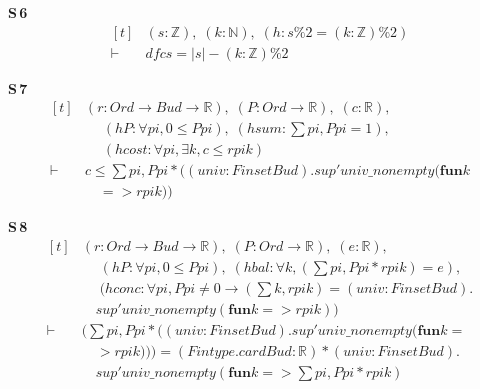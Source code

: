 \noindent\textbf{S\,6}\quad{}
{\footnotesize\[ \begin{aligned}[t]
&(\mathit{s} : \mathbb{Z} ),\; (\mathit{k} : \mathbb{N} ),\; (\mathit{h} : \mathit{s} \% 2 = (\mathit{k} : \mathbb{Z} ) \% 2)\\
\vdash\;&\mathit{dfc} \mathit{s} = |\mathit{s}| - (\mathit{k} : \mathbb{Z} ) \% 2
\end{aligned} \]}

\noindent\textbf{S\,7}\quad{}
{\footnotesize\[ \begin{aligned}[t]
&(\mathit{r} : \mathit{Ord} \to \mathit{Bud} \to \mathbb{R} ),\; (\mathit{P} : \mathit{Ord} \to \mathbb{R} ),\; (\mathit{c} : \mathbb{R} ),\\
&\quad \; (\mathit{hP} : \forall \mathit{pi}, 0 \leq \mathit{P} \mathit{pi}),\; (\mathit{hsum} : \textstyle\sum \mathit{pi}, \mathit{P} \mathit{pi} = 1),\\
&\quad \; (\mathit{hcost} : \forall \mathit{pi}, \exists \mathit{k}, \mathit{c} \leq \mathit{r} \mathit{pi} \mathit{k})\\
\vdash\;&\mathit{c} \leq \textstyle\sum \mathit{pi}, \mathit{P} \mathit{pi} * ((\mathit{univ} : \mathit{Finset} \mathit{Bud}).\mathit{sup'} \mathit{univ\_nonempty} (\mathbf{fun} \mathit{k}\\
&\quad => \mathit{r} \mathit{pi} \mathit{k}))
\end{aligned} \]}

\noindent\textbf{S\,8}\quad{}
{\footnotesize\[ \begin{aligned}[t]
&(\mathit{r} : \mathit{Ord} \to \mathit{Bud} \to \mathbb{R} ),\; (\mathit{P} : \mathit{Ord} \to \mathbb{R} ),\; (\mathit{e} : \mathbb{R} ),\\
&\quad \; (\mathit{hP} : \forall \mathit{pi}, 0 \leq \mathit{P} \mathit{pi}),\; (\mathit{hbal} : \forall \mathit{k}, (\textstyle\sum \mathit{pi}, \mathit{P} \mathit{pi} * \mathit{r} \mathit{pi} \mathit{k}) = \mathit{e}),\\
&\quad \; (\mathit{hconc} : \forall \mathit{pi}, \mathit{P} \mathit{pi} \neq 0 \to (\textstyle\sum \mathit{k}, \mathit{r} \mathit{pi} \mathit{k}) = (\mathit{univ} : \mathit{Finset} \mathit{Bud}).\\
&\quad \mathit{sup'} \mathit{univ\_nonempty} (\mathbf{fun} \mathit{k} => \mathit{r} \mathit{pi} \mathit{k}))\\
\vdash\;&(\textstyle\sum \mathit{pi}, \mathit{P} \mathit{pi} * ((\mathit{univ} : \mathit{Finset} \mathit{Bud}).\mathit{sup'} \mathit{univ\_nonempty} (\mathbf{fun} \mathit{k} =\\
&\quad > \mathit{r} \mathit{pi} \mathit{k}))) = (\mathit{Fintype}.\mathit{card} \mathit{Bud} : \mathbb{R} ) * (\mathit{univ} : \mathit{Finset} \mathit{Bud}).\\
&\quad \mathit{sup'} \mathit{univ\_nonempty} (\mathbf{fun} \mathit{k} => \textstyle\sum \mathit{pi}, \mathit{P} \mathit{pi} * \mathit{r} \mathit{pi} \mathit{k})
\end{aligned} \]}

